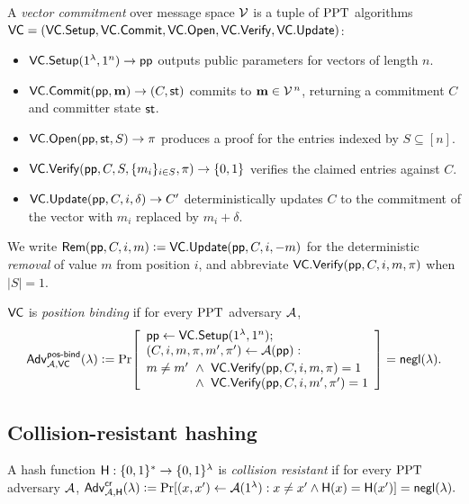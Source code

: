 \begin{definition}\label{def:vc}
A \emph{vector commitment} over message space $\mathcal{V}$ is a tuple of $\mathrm{PPT}$
algorithms $\mathsf{VC}=(\mathsf{VC}.\mathsf{Setup},\mathsf{VC}.\mathsf{Commit},\mathsf{VC}.\mathsf{Open},\mathsf{VC}.\mathsf{Verify},\mathsf{VC}.\mathsf{Update})$:
\begin{itemize}[leftmargin=1.4em,itemsep=2pt]
  \item $\mathsf{VC}.\mathsf{Setup}(1^\lambda,1^n)\to\mathsf{pp}$ outputs public parameters for vectors
        of length $n$.
  \item $\mathsf{VC}.\mathsf{Commit}(\mathsf{pp},\mathbf{m})\to(C,\mathsf{st})$ commits to
        $\mathbf{m}\in\mathcal{V}^{\,n}$, returning a commitment $C$ and committer state
        $\mathsf{st}$.
  \item $\mathsf{VC}.\mathsf{Open}(\mathsf{pp},\mathsf{st},S)\to\pi$ produces a proof for the entries indexed by
        $S\subseteq[n]$.
  \item $\mathsf{VC}.\mathsf{Verify}(\mathsf{pp},C,S,\{m_i\}_{i\in S},\pi)\to\{0,1\}$ verifies the claimed
        entries against $C$.
  \item $\mathsf{VC}.\mathsf{Update}(\mathsf{pp},C,i,\delta)\to C'$ deterministically updates $C$ to the
        commitment of the vector with $m_i$ replaced by $m_i+\delta$.
\end{itemize}
We write $\mathsf{Rem}(\mathsf{pp},C,i,m)\vcentcolon=\mathsf{VC}.\mathsf{Update}(\mathsf{pp},C,i,-m)$ for the deterministic
\emph{removal} of value $m$ from position $i$, and abbreviate
$\mathsf{VC}.\mathsf{Verify}(\mathsf{pp},C,i,m,\pi)$ when $|S|=1$.
\end{definition}

\begin{definition}\label{def:posbind}
$\mathsf{VC}$ is \emph{position binding} if for every $\mathrm{PPT}$ adversary $\mathcal{A}$,
\[
  \mathsf{Adv}^{\mathsf{pos\text{-}bind}}_{\mathcal{A},\mathsf{VC}}(\lambda)\vcentcolon=
  \Pr\!\left[
    \begin{array}{l}
      \mathsf{pp}\leftarrow\mathsf{VC}.\mathsf{Setup}(1^\lambda,1^n);\\
      (C,i,m,\pi,m',\pi')\leftarrow\mathcal{A}(\mathsf{pp}):\\[2pt]
      m\neq m'\ \wedge\ \mathsf{VC}.\mathsf{Verify}(\mathsf{pp},C,i,m,\pi)=1\\
      \hphantom{m\neq m'}\ \wedge\ \mathsf{VC}.\mathsf{Verify}(\mathsf{pp},C,i,m',\pi')=1
    \end{array}
  \right]=\mathsf{negl}(\lambda).
\]
\end{definition}

\subsection{Collision-resistant hashing}

\begin{definition}[CRHF]\label{def:crhf}
A hash function $\mathsf{H}:\{0,1\}^{*}\to\{0,1\}^{\lambda}$ is \emph{collision resistant}
if for every $\mathrm{PPT}$ adversary $\mathcal{A}$,
$\mathsf{Adv}^{\mathsf{cr}}_{\mathcal{A},\mathsf{H}}(\lambda)\vcentcolon=
 \Pr[(x,x')\leftarrow\mathcal{A}(1^\lambda):x\neq x'\wedge\mathsf{H}(x)=\mathsf{H}(x')]
 =\mathsf{negl}(\lambda).$
\end{definition}

